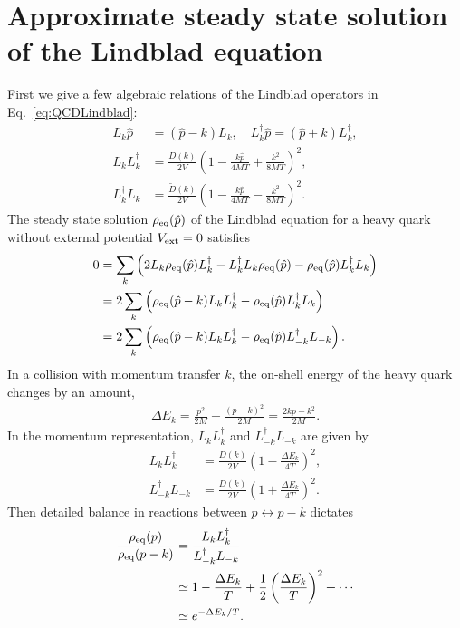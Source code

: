 \documentclass[prd,11pt, amsmath, amsymb, aps, reprint, tightenlines, nofootinbib, longbibliography, abbrv, preprintnumbers]{revtex4-1}
\begin{document}
\section{Approximate steady state solution of the Lindblad equation}
\label{app:steadystate}
First we give a few algebraic relations of the Lindblad operators in Eq.~\eqref{eq:QCDLindblad}:
\begin{subequations}
\begin{align}
L_k \hat p &= (\hat p-k)L_k, \quad
L_k^{\dagger} \hat p = (\hat p+k)L_k^{\dagger},\\
L_k L_k^{\dagger} &= \frac{\tilde D(k)}{2V}\left(1-\frac{k\hat p}{4MT} + \frac{k^2}{8MT}\right)^2,\\
L_k^{\dagger} L_k &= \frac{\tilde D(k)}{2V}\left(1-\frac{k\hat p}{4MT} - \frac{k^2}{8MT}\right)^2.
\end{align}
\end{subequations}
The steady state solution $\rho_{\rm eq}(\hat p)$ of the Lindblad equation for a heavy quark without external potential $V_{\rm ext}=0$ satisfies
\begin{align}
0&=\sum_k\left(
2L_k\rho_{\rm eq}(\hat p) L_k^{\dagger} - L_k^{\dagger}L_k\rho_{\rm eq}(\hat p) - \rho_{\rm eq}(\hat p) L_k^{\dagger} L_k
\right)\nonumber \\
&=2\sum_k\left(
\rho_{\rm eq}(\hat p - k) L_kL_k^{\dagger} - \rho_{\rm eq}(\hat p) L_k^{\dagger} L_k
\right)\nonumber \\
&=2\sum_k\left(
\rho_{\rm eq}(\hat p - k) L_kL_k^{\dagger} - \rho_{\rm eq}(\hat p) L_{-k}^{\dagger} L_{-k}
\right).
\end{align}
In a collision with momentum transfer $k$, the on-shell energy of the heavy quark changes by an amount,
\begin{align}
\Delta E_{k} = \frac{p^2}{2M} - \frac{(p-k)^2}{2M} = \frac{2kp - k^2}{2M}.
\end{align}
In the momentum representation, $L_k L_k^{\dagger}$ and $L_{-k}^{\dagger} L_{-k}$ are given by
\begin{subequations}
\begin{align}
L_k L_k^{\dagger} &= \frac{\tilde D(k)}{2V}\left(1-\frac{\Delta E_k}{4T}\right)^2, \\
L_{-k}^{\dagger}L_{-k} &= \frac{\tilde D(k)}{2V}\left(1+\frac{\Delta E_k}{4T}\right)^2.
\end{align}
\end{subequations}
Then detailed balance in reactions between $p\leftrightarrow p-k$ dictates
\begin{align}
\frac{\rho_{\rm eq}(p)}{\rho_{\rm eq}(p-k)} &= \frac{L_k L_k^{\dagger}}{L_{-k}^{\dagger}L_{-k}}\nonumber \\
&\simeq 1-\frac{\Delta E_k}{T} + \frac{1}{2}\left(\frac{\Delta E_k}{T}\right)^2 + \cdots \nonumber \\
&\simeq e^{-\Delta E_k/T}.
\end{align}
\end{document}

